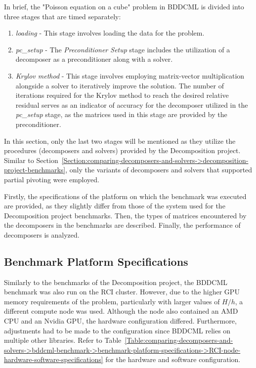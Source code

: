In brief, the "Poisson equation on a cube" problem in BDDCML is divided into three stages that are timed separately\label{Text:comparing-decomposers-and-solvers->bddcml-benchmark->poisson-on-cube-stages}:

\begin{enumerate}
	\itemsep=0em %
	\item \textit{loading} - This stage involves loading the data for the problem.
	\item \textit{pc\_setup} - The \textit{Preconditioner Setup} stage includes the utilization of a decomposer as a preconditioner along with a solver.
	\item \textit{Krylov method} - This stage involves employing matrix-vector multiplication alongside a solver to iteratively improve the solution. The number of iterations required for the Krylov method to reach the desired relative residual serves as an indicator of accuracy for the decomposer utilized in the \textit{pc\_setup} stage, as the matrices used in this stage are provided by the preconditioner.
\end{enumerate}

In this section, only the last two stages will be mentioned as they utilize the procedures (decomposers and solvers) provided by the Decomposition project. Similar to Section~\ref{Section:comparing-decomposers-and-solvers->decomposition-project-benchmarks}, only the variants of decomposers and solvers that supported partial pivoting were employed.

Firstly, the specifications of the platform on which the benchmark was executed are provided, as they slightly differ from those of the system used for the Decomposition project benchmarks. Then, the types of matrices encountered by the decomposers in the benchmarks are described. Finally, the performance of decomposers is analyzed.

\subsection{Benchmark Platform Specifications}\label{Subsection:comparing-decomposers-and-solvers->bddcml-benchmark->benchmark-platform-specifications}
Similarly to the benchmarks of the Decomposition project, the BDDCML benchmark was also run on the RCI cluster. However, due to the higher GPU memory requirements of the problem, particularly with larger values of $H/h$, a different compute node was used. Although the node also contained an AMD CPU and an Nvidia GPU, the hardware configuration differed. Furthermore, adjustments had to be made to the configuration since BDDCML relies on multiple other libraries. Refer to Table~\ref{Table:comparing-decomposers-and-solvers->bddcml-benchmark->benchmark-platform-specifications->RCI-node-hardware-software-specifications} for the hardware and software configuration.

